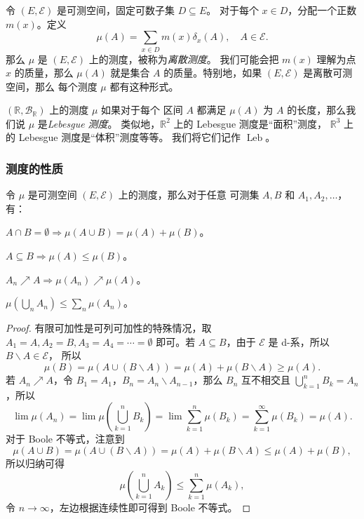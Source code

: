 \documentclass[fontset=none]{Notes}
\DeclareMathOperator\Leb{Leb}
\begin{document}
\begin{example}[离散测度]
  令 $(E,\mathcal{E})$ 是可测空间，固定可数子集 $D\subseteq E$。
  对于每个 $x\in D$，分配一个正数 $m(x)$。定义
  \[
    \mu(A)=\sum_{x\in D} m(x)\delta_x(A),\quad A\in \mathcal{E}.  
  \]
  那么 $\mu$ 是 $(E,\mathcal{E})$ 上的测度，被称为\emph{离散测度}。
  我们可能会把 $m(x)$ 理解为点 $x$ 的质量，那么 $\mu(A)$ 就是集合 $A$
  的质量。特别地，如果 $(E,\mathcal{E})$ 是离散可测空间，那么
  每个测度 $\mu$ 都有这种形式。
\end{example}

\begin{example}[Lebesgue 测度]
  $(\mathbb{R},\mathcal{B}_{\mathbb{R}})$ 上的测度 $\mu$ 如果对于每个
  区间 $A$ 都满足 $\mu(A)$ 为 $A$ 的长度，那么我们说 $\mu$ 是\emph{Lebesgue 测度}。
  类似地，$\mathbb{R}^2$ 上的 Lebesgue 测度是“面积”测度，
  $\mathbb{R}^3$ 上的 Lebesgue 测度是“体积”测度等等。
  我们将它们记作 $\Leb$。
\end{example}

\subsubsection{测度的性质}

\begin{proposition}
  令 $\mu$ 是可测空间 $(E,\mathcal{E})$ 上的测度，那么对于任意
  可测集 $A,B$ 和 $A_1,A_2,\dots$，有：
  \begin{description}[nosep,font=\sffamily\mdseries,itemindent=0pt]
    \item[有限可加性] $A\cap B=\emptyset\Rightarrow \mu(A\cup B)=\mu(A)+\mu(B)$。
    \item[单调性] $A\subseteq B\Rightarrow \mu(A)\leq \mu(B)$。
    \item[连续性] $A_n\nearrow A\Rightarrow \mu(A_n)\nearrow \mu(A)$。
    \item[Boole 不等式]  $\mu(\bigcup_n A_n)\leq \sum_n \mu(A_n)$。  
  \end{description}
\end{proposition}
\begin{proof}
  有限可加性是可列可加性的特殊情况，取 $A_1=A,A_2=B,A_3=A_4=\cdots=\emptyset$
  即可。若 $A\subseteq B$，由于 $\mathcal{E}$ 是 d-系，所以 $B \smallsetminus A\in \mathcal{E}$，
  所以
  \[
    \mu(B)=\mu(A\cup(B \smallsetminus A))= \mu(A)+\mu(B \smallsetminus A)
    \geq \mu(A).
  \]
  若 $A_n\nearrow A$，令 $B_1=A_1$，$B_n=A_{n}\smallsetminus A_{n-1}$，那么
  $B_n$ 互不相交且 $\bigcup_{k=1}^n B_k=A_n$，所以
  \[
    \lim \mu(A_n)=\lim\mu\left(\bigcup_{k=1}^n B_k\right)  
    =\lim \sum_{k=1}^n \mu(B_k)=\sum_{k=1}^\infty \mu(B_k)
    =\mu(A).
  \]
  对于 Boole 不等式，注意到
  \[
    \mu(A\cup B)=\mu(A\cup (B \smallsetminus A))=\mu(A)+\mu(B \smallsetminus A) 
    \leq \mu(A)+\mu (B), 
  \]
  所以归纳可得
  \[
    \mu\left(\bigcup_{k=1}^n A_k\right)\leq \sum_{k=1}^n\mu(A_k),  
  \]
  令 $n\to\infty$，左边根据连续性即可得到 Boole 不等式。
\end{proof}
\end{document}
